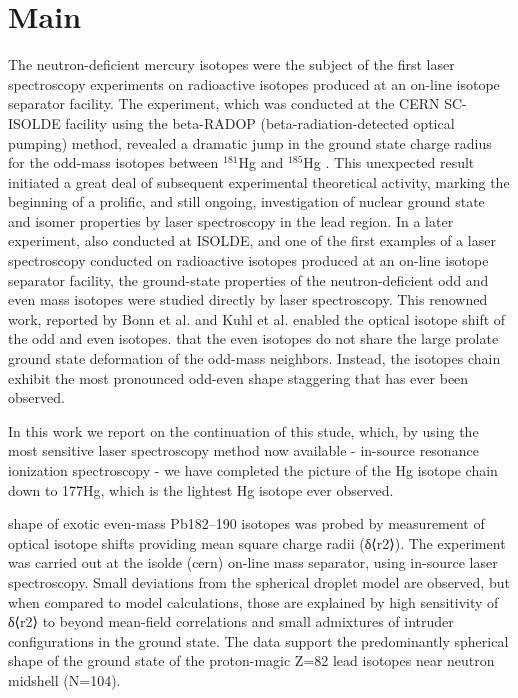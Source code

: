 \section{Main} 


The neutron-deficient mercury isotopes were the subject of the first laser spectroscopy experiments on radioactive isotopes produced at an on-line isotope separator facility.  The experiment, which was conducted at the CERN SC-ISOLDE facility using the beta-RADOP (beta-radiation-detected optical pumping) method, revealed a dramatic jump in the ground state charge radius for the odd-mass isotopes between $^{181}$Hg and $^{185}$Hg \cite{Huber_1976}.  This unexpected result initiated a great deal of subsequent experimental theoretical activity, marking the beginning of a prolific, and still ongoing, investigation of nuclear ground state and isomer properties by laser spectroscopy in the lead region.  In a later experiment, also conducted at ISOLDE, and one of the first examples of a laser spectroscopy conducted on radioactive isotopes produced at an on-line isotope separator facility, the ground-state properties of the neutron-deficient odd and even mass isotopes were studied directly by laser spectroscopy.  This renowned work, \cite{K_hl_1977} reported by Bonn et al. and Kuhl et al. enabled the optical isotope shift of the odd and even isotopes.   that the even isotopes do not share the large prolate ground state deformation of the odd-mass neighbors.  Instead, the isotopes chain exhibit the most pronounced odd-even shape staggering that has ever been observed.

In this work we report on the continuation of this stude, which, by using the most sensitive laser spectroscopy method now available - in-source resonance ionization spectroscopy - we have completed the picture of the Hg isotope chain down to 177Hg, which is the lightest Hg isotope ever observed.

shape of exotic even-mass Pb182–190 isotopes was probed by measurement of optical isotope shifts providing mean square charge radii (δ⟨r2⟩). The experiment was carried out at the isolde (cern) on-line mass separator, using in-source laser spectroscopy. Small deviations from the spherical droplet model are observed, but when compared to model calculations, those are explained by high sensitivity of δ⟨r2⟩ to beyond mean-field correlations and small admixtures of intruder configurations in the ground state. The data support the predominantly spherical shape of the ground state of the proton-magic Z=82 lead isotopes near neutron midshell (N=104).


